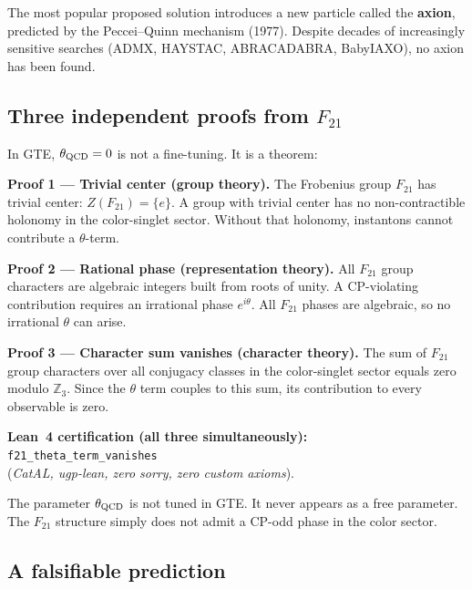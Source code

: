 \documentclass[11pt,a4paper]{article}
\newcommand{\term}[1]{\textbf{#1}}
\newcommand{\lean}[1]{\texttt{#1}}
\begin{document}
The most popular proposed solution introduces a new particle called the
\term{axion}, predicted by the Peccei--Quinn mechanism (1977).  Despite
decades of increasingly sensitive searches (ADMX, HAYSTAC, ABRACADABRA,
BabyIAXO), no axion has been found.

\subsection{Three independent proofs from $F_{21}$}

In GTE, $\theta_{\rm QCD} = 0$ is not a fine-tuning.  It is a theorem:

\begin{tcolorbox}[colback=boxgreen,colframe=green!50!black,breakable,
  title={Result: $\theta_{\rm QCD}=0$ by $F_{21}$ Structure (ROBUST, machine-certified)}]

\textbf{Proof 1 --- Trivial center (group theory).}
The Frobenius group $F_{21}$ has trivial center:
$Z(F_{21}) = \{e\}$.  A group with trivial center has no non-contractible
holonomy in the color-singlet sector.  Without that holonomy, instantons
cannot contribute a $\theta$-term.

\medskip
\textbf{Proof 2 --- Rational phase (representation theory).}
All $F_{21}$ group characters are algebraic integers built from roots of
unity.  A CP-violating contribution requires an irrational phase
$e^{i\theta}$.  All $F_{21}$ phases are algebraic, so no irrational
$\theta$ can arise.

\medskip
\textbf{Proof 3 --- Character sum vanishes (character theory).}
The sum of $F_{21}$ group characters over all conjugacy classes in the
color-singlet sector equals zero modulo $\mathbb{Z}_3$.  Since the
$\theta$ term couples to this sum, its contribution to every observable
is zero.

\medskip
\textbf{Lean~4 certification (all three simultaneously):}\\
\lean{f21\_theta\_term\_vanishes}\\
(\textit{CatAL, ugp-lean, zero sorry, zero custom axioms}).
\end{tcolorbox}

\noindent
The parameter $\theta_{\rm QCD}$ is not tuned in GTE.  It never appears as
a free parameter.  The $F_{21}$ structure simply does not admit a CP-odd
phase in the color sector.

\subsection{A falsifiable prediction}
\end{document}
